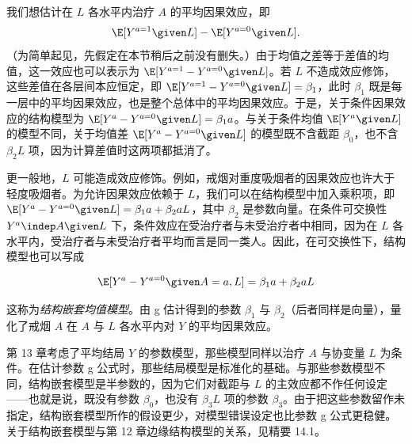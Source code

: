 我们想估计在 $L$ 各水平内治疗 $A$ 的平均因果效应，即
\[
\E[Y^{a=1}\given L]-\E[Y^{a=0}\given L].
\]
（为简单起见，先假定在本节稍后之前没有删失。）由于均值之差等于差值的均值，这一效应也可以表示为 $\E[Y^{a=1}-Y^{a=0}\given L]$。若 $L$ 不造成效应修饰，这些差值在各层间本应恒定，即 $\E[Y^{a=1}-Y^{a=0}\given L]=\beta_1$，此时 $\beta_1$ 既是每一层中的平均因果效应，也是整个总体中的平均因果效应。于是，关于条件因果效应的结构模型为 $\E[Y^a-Y^{a=0}\given L]=\beta_1a$。与关于条件均值 $\E[Y^a\given L]$ 的模型不同，关于均值差 $\E[Y^a-Y^{a=0}\given L]$ 的模型既不含截距 $\beta_0$，也不含 $\beta_2L$ 项，因为计算差值时这两项都抵消了。

更一般地，$L$ 可能造成效应修饰。例如，戒烟对重度吸烟者的因果效应也许大于轻度吸烟者。为允许因果效应依赖于 $L$，我们可以在结构模型中加入乘积项，即 $\E[Y^a-Y^{a=0}\given L]=\beta_1a+\beta_2aL$，其中 $\beta_2$ 是参数向量。在条件可交换性 $Y^a\indep A\given L$ 下，条件效应在受治疗者与未受治疗者中相同，因为在 $L$ 各水平内，受治疗者与未受治疗者平均而言是同一类人。因此，在可交换性下，结构模型也可以写成

\[
\E[Y^a-Y^{a=0}\given A=a,L]=\beta_1a+\beta_2aL
\]

这称为\emph{结构嵌套均值模型}。由 g 估计得到的参数 $\beta_1$ 与 $\beta_2$（后者同样是向量），量化了戒烟 $A$ 在 $A$ 与 $L$ 各水平内对 $Y$ 的平均因果效应。

第 13 章考虑了平均结局 $Y$ 的参数模型，那些模型同样以治疗 $A$ 与协变量 $L$ 为条件。在估计参数 g 公式时，那些结局模型是标准化的基础。与那些参数模型不同，结构嵌套模型是半参数的，因为它们对截距与 $L$ 的主效应都不作任何设定——也就是说，既没有参数 $\beta_0$，也没有 $\beta_3L$ 项的参数 $\beta_3$。由于把这些参数留作未指定，结构嵌套模型所作的假设更少，对模型错误设定也比参数 g 公式更稳健。关于结构嵌套模型与第 12 章边缘结构模型的关系，见精要 14.1。



